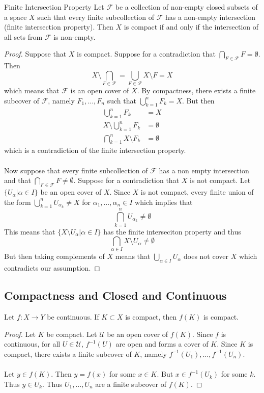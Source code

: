 \documentclass[a4paper]{article}
\begin{document}
\begin{thm}{Finite Intersection Property}{} Let $\mathcal{F}$ be a collection of non-empty closed subsets of a space $X$ such that every finite subcollection of $\mathcal{F}$ has a non-empty intersection (finite intersection property). Then $X$ is compact if and only if the intersection of all sets from $\mathcal{F}$ is non-empty. \tcbline
\begin{proof}
Suppose that $X$ is compact. Suppose for a contradiction that $\bigcap_{F\in\mathcal{F}}F=\emptyset$. Then $$X\setminus\bigcap_{F\in\mathcal{F}}=\bigcup_{F\in\mathcal{F}}X\setminus F=X$$ which means that $\mathcal{F}$ is an open cover of $X$. By compactness, there exists a finite subcover of $\mathcal{F}$, namely $F_1,\dots, F_n$ such that $\bigcup_{k=1}^nF_k=X$. But then 
\begin{align*}
\bigcup_{k=1}^nF_k&=X\\
X\setminus\bigcup_{k=1}^nF_k&=\emptyset\\
\bigcap_{k=1}^nX\setminus F_k&=\emptyset
\end{align*}
which is a contradiction of the finite intersection property. \\~\\
Now suppose that every finite subcollection of $\mathcal{F}$ has a non empty intersection and that $\bigcap_{F\in\mathcal{F}}F\neq\emptyset$. Suppose for a contradiction that $X$ is not compact. Let $\{U_\alpha|\alpha\in I\}$ be an open cover of $X$. Since $X$ is not compact, every finite union of the form $\bigcup_{k=1}^nU_{\alpha_k}\neq X$ for $\alpha_1,\dots,\alpha_n\in I$ which implies that $$\bigcap_{k=1}^nU_{\alpha_k}\neq\emptyset$$ This means that $\{X\setminus U_\alpha|\alpha\in I\}$ has the finite interseciton property and thus $$\bigcap_{\alpha\in I}X\setminus U_\alpha\neq\emptyset$$ But then taking complements of $X$ means that $\bigcup_{\alpha\in I}U_\alpha$ does not cover $X$ which contradicts our assumption. 
\end{proof}
\end{thm}

\subsection{Compactness and Closed and Continuous}
\begin{prp}{}{} Let $f:X\to Y$ be continuous. If $K\subset X$ is compact, then $f(K)$ is compact.  \tcbline
\begin{proof}
Let $K$ be compact. Let $\mathcal{U}$ be an open cover of $f(K)$. Since $f$ is continuous, for all $U\in\mathcal{U}$, $f^{-1}(U)$ are open and forms a cover of $K$. Since $K$ is compact, there exists a finite subcover of $K$, namely $f^{-1}(U_1),\dots,f^{-1}(U_n)$. \\~\\
Let $y\in f(K)$. Then $y=f(x)$ for some $x\in K$. But $x\in f^{-1}(U_k)$ for some $k$. Thus $y\in U_k$. Thus $U_1,\dots,U_n$ are a finite subcover of $f(K)$. 
\end{proof}
\end{prp}
\end{document}
